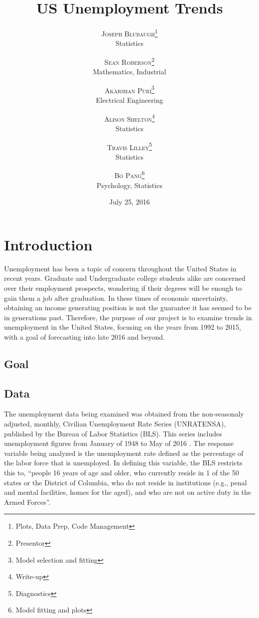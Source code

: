\documentclass[twoside,twocolumn]{article}
\title{US Unemployment Trends} %
\author{%
\textsc{Joseph Blubaugh}\thanks{Plots, Data Prep, Code Management} \\[1ex] %
\normalsize Statistics\\ %
\and %
\textsc{Sean Roberson}\thanks{Presentor} \\[1ex] %
\normalsize Mathematics, Industrial\\ %
\and 
\textsc{Akarshan Puri}\thanks{Model selection and fitting} \\[1ex] 
\normalsize Electrical Engineering\\ 
\and 
\textsc{Alison Shelton}\thanks{Write-up} \\[1ex] 
\normalsize Statistics\\ 
\and 
\textsc{Travis Lilley}\thanks{Diagnostics} \\[1ex] 
\normalsize Statistics\\ 
\and
\textsc{Bo Pang}\thanks{Model fitting and plots} \\[1 ex]
\normalsize Psychology, Statistics
\vspace*{.5 cm}
}
\date{July 25, 2016 \vspace*{.25 cm}} %
\begin{document}
\maketitle


\section{Introduction}
		Unemployment has been a topic of concern throughout the United States in recent years.  Graduate and Undergraduate college students alike are concerned over their employment prospects, wondering if their degrees will be enough to gain them a job after graduation.  In these times of economic uncertainty, obtaining an income generating position is not the guarantee it has seemed to be in generations past. Therefore, the purpose of our project is to examine trends in unemployment in the United States, focusing  on the years from 1992 to 2015, with a goal of forecasting into late 2016 and beyond.
	
		
	

\subsection{Goal}
\blindtext %

\subsection{Data}

The unemployment data being examined was obtained from the non-seasonaly adjusted, monthly, Civilian Unemployment Rate Series (UNRATENSA), published by the Bureau of Labor Statistics (BLS).  This series includes unemployment figures from January of 1948 to  May of 2016 \citep{blsref}.  The response variable being analyzed is the unemployment rate defined as the percentage of the labor force that is unemployed.  In defining this variable, the BLS restricts this to, ``people 16 years of age and older, who currently reside in 1 of the 50 states or the District of Columbia, who do not reside in institutions (e.g., penal and mental facilities, homes for the aged), and who are not on active duty in the Armed Forces''.

\end{document}
